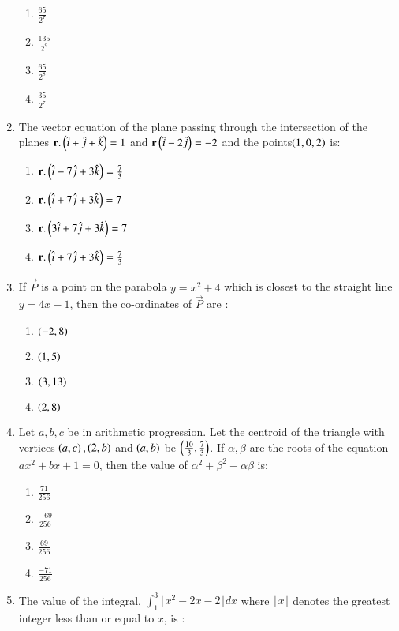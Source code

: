 \documentclass[journal,12pt,onecolumn]{IEEEtran}
\theoremstyle{remark}
\begin{document}
\begin{enumerate}
    \begin{enumerate}
        \item $\frac{65}{2^{7}}$
        \item $\frac{135}{2^{9}}$
        \item $\frac{65}{2^{8}}$
        \item $\frac{35}{2^{7}}$
    \end{enumerate}
    \item The vector equation of the plane passing through the intersection of the planes $\mathbf{r}.\left(\hat{i}+\hat{j}+\hat{k}\right)=1$ and $\mathbf{r}\left(\hat{i}-2\hat{j}\right)=-2$ and the points$\left(1,0,2\right)$ is:
        \begin{enumerate}
        \item $\mathbf{r}.\left(\hat{i}-7\hat{j}+3\hat{k}\right)=\frac{7}{3}$
        \item $\mathbf{r}.\left(\hat{i}+7\hat{j}+3\hat{k}\right)=7$
        \item $\mathbf{r}.\left(3\hat{i}+7\hat{j}+3\hat{k}\right)=7$
        \item $\mathbf{r}.\left(\hat{i}+7\hat{j}+3\hat{k}\right)=\frac{7}{3}$
    \end{enumerate}
    \item If $\vec{P}$ is a point on the parabola $y = x^2 + 4$ which is closest to the straight line $y = 4x-1$, then the co-ordinates of $\vec{P}$ are :
    \begin{enumerate}
        \item $\left(-2,8\right)$
        \item $\left(1,5\right)$
        \item $\left(3,13\right)$
        \item $\left(2,8\right)$
    \end{enumerate}
    \item Let $a, b, c$ be in arithmetic progression. Let the centroid of the triangle with vertices $\left(a, c\right), \left(2, b\right)$ and $\left(a, b\right)$ be $\left(\frac{10}{3}, \frac{7}{3}\right)$. If $\alpha,\beta$ are the roots of the equation $ax^2 + bx + 1 = 0$, then the value of $\alpha^2 + \beta^2 - \alpha\beta$ is:
    \begin{enumerate}
        \item $\frac{71}{256}$
        \item $\frac{-69}{256}$
        \item $\frac{69}{256}$
        \item $\frac{-71}{256}$ 
    \end{enumerate}
    \item The value of the integral, $\int_{1}^{3}\lfloor x^2 - 2x- 2\rfloor dx$ where $\lfloor x \rfloor$ denotes the greatest integer less than or equal to $x$, is :

\end{enumerate}
\end{document}

